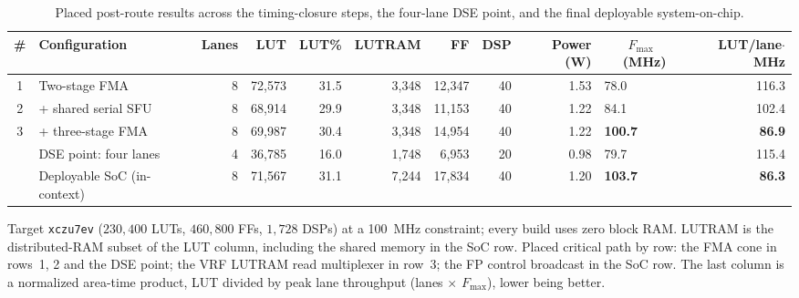 \documentclass[10pt,conference]{IEEEtran}
\newcommand{\Fmax}{$F_{\mathrm{max}}$}
\begin{document}
\begin{table}[t]
\caption{Placed post-route results across the timing-closure steps, the four-lane
DSE point, and the final deployable system-on-chip.}
\label{tab:fpclose}
\centering
\footnotesize
\setlength{\tabcolsep}{6pt}
\begin{tabular}{clrrrrrrrlr}
\toprule
\# & Configuration & Lanes & LUT & LUT\% & LUTRAM & FF & DSP & Power (W)
   & \multicolumn{1}{c}{\Fmax\ (MHz)} & LUT/lane$\cdot$MHz \\
\midrule
1 & Two-stage FMA               & 8 & 72{,}573 & 31.5 & 3{,}348 & 12{,}347 & 40 & 1.53 & \phantom{0}78.0 & 116.3 \\
2 & \quad + shared serial SFU   & 8 & 68{,}914 & 29.9 & 3{,}348 & 11{,}153 & 40 & 1.22 & \phantom{0}84.1 & 102.4 \\
3 & \quad + three-stage FMA     & 8 & 69{,}987 & 30.4 & 3{,}348 & 14{,}954 & 40 & 1.22 & \textbf{100.7} & \textbf{86.9} \\
\midrule
  & DSE point: four lanes       & 4 & 36{,}785 & 16.0 & 1{,}748 & \phantom{0}6{,}953 & 20 & 0.98 & \phantom{0}79.7 & 115.4 \\
\midrule
  & Deployable SoC (in-context) & 8 & 71{,}567 & 31.1 & 7{,}244 & 17{,}834 & 40 & 1.20 & \textbf{103.7} & \textbf{86.3} \\
\bottomrule
\end{tabular}

\vspace{3pt}
\begin{minipage}{0.90\textwidth}
\footnotesize
Target \texttt{xczu7ev} ($230{,}400$ LUTs, $460{,}800$ FFs, $1{,}728$ DSPs) at a
100~MHz constraint; every build uses zero block RAM. LUTRAM is the distributed-RAM
subset of the LUT column, including the shared memory in the SoC row. Placed
critical path by row: the FMA cone in rows~1, 2 and the DSE point; the VRF LUTRAM
read multiplexer in row~3; the FP control broadcast in the SoC row. The last
column is a normalized area-time product, LUT divided by peak lane throughput
(lanes $\times$ \Fmax), lower being better.
\end{minipage}
\end{table}
\end{document}
